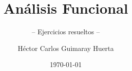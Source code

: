 \documentclass[graybox,envcountchap,sectrefs]{svmono}
\date{\today}
\begin{document}
\author{Héctor Carlos Guimaray Huerta}
\title{Análisis Funcional}
\subtitle{-- Ejercicios resueltos --}
\maketitle

\frontmatter%






\tableofcontents

\mainmatter%



\backmatter%

\printindex

\end{document}
